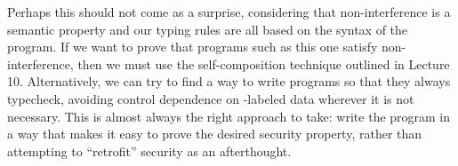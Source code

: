 \documentclass[11pt,twoside]{scrartcl}
\begin{document}
Perhaps this should not come as a surprise, considering that non-interference is a semantic property and our typing rules are all based on the syntax of the program. If we want to prove that programs such as this one satisfy non-interference, then we must use the self-composition technique outlined in Lecture 10. Alternatively, we can try to find a way to write programs so that they always typecheck, avoiding control dependence on \hisec-labeled data wherever it is not necessary. This is almost always the right approach to take: write the program in a way that makes it easy to prove the desired security property, rather than attempting to ``retrofit'' security as an afterthought.

% 

\end{document}
